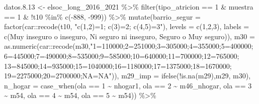 \documentclass[
  12pt,
]{book}
\newenvironment{Shaded}{\begin{snugshade}}{\end{snugshade}}
\newcommand{\AttributeTok}[1]{\textcolor[rgb]{0.77,0.63,0.00}{#1}}
\newcommand{\DecValTok}[1]{\textcolor[rgb]{0.00,0.00,0.81}{#1}}
\newcommand{\FloatTok}[1]{\textcolor[rgb]{0.00,0.00,0.81}{#1}}
\newcommand{\FunctionTok}[1]{\textcolor[rgb]{0.00,0.00,0.00}{#1}}
\newcommand{\NormalTok}[1]{#1}
\newcommand{\OtherTok}[1]{\textcolor[rgb]{0.56,0.35,0.01}{#1}}
\newcommand{\SpecialCharTok}[1]{\textcolor[rgb]{0.00,0.00,0.00}{#1}}
\newcommand{\StringTok}[1]{\textcolor[rgb]{0.31,0.60,0.02}{#1}}
\begin{document}
\begin{Shaded}
\begin{Highlighting}[]
\NormalTok{datos.}\FloatTok{8.13} \OtherTok{\textless{}{-}}\NormalTok{ elsoc\_long\_2016\_2021 }\SpecialCharTok{\%\textgreater{}\%} 
  \FunctionTok{filter}\NormalTok{(tipo\_atricion }\SpecialCharTok{==} \DecValTok{1} \SpecialCharTok{\&}\NormalTok{ muestra }\SpecialCharTok{==} \DecValTok{1} \SpecialCharTok{\&} \SpecialCharTok{!}\NormalTok{t10 }\SpecialCharTok{\%in\%} \FunctionTok{c}\NormalTok{(}\SpecialCharTok{{-}}\DecValTok{888}\NormalTok{, }\SpecialCharTok{{-}}\DecValTok{999}\NormalTok{)) }\SpecialCharTok{\%\textgreater{}\%} 
  \FunctionTok{mutate}\NormalTok{(}\AttributeTok{barrio\_segur =} \FunctionTok{factor}\NormalTok{(car}\SpecialCharTok{::}\FunctionTok{recode}\NormalTok{(t10, }\StringTok{"c(1,2)=1; c(3)=2; c(4,5)=3"}\NormalTok{), }\AttributeTok{levels =} \FunctionTok{c}\NormalTok{(}\DecValTok{1}\NormalTok{,}\DecValTok{2}\NormalTok{,}\DecValTok{3}\NormalTok{),}
                               \AttributeTok{labels =} \FunctionTok{c}\NormalTok{(}\StringTok{\textquotesingle{}Muy inseguro o inseguro\textquotesingle{}}\NormalTok{, }\StringTok{\textquotesingle{}Ni seguro ni inseguro\textquotesingle{}}\NormalTok{,}
                                          \StringTok{\textquotesingle{}Seguro o Muy seguro\textquotesingle{}}\NormalTok{)),}
         \AttributeTok{m30 =} \FunctionTok{as.numeric}\NormalTok{(car}\SpecialCharTok{::}\FunctionTok{recode}\NormalTok{(m30,}\StringTok{"1=110000;2=251000;3=305000;4=355000;5=400000;}
\StringTok{                                           6=445000;7=490000;8=535000;9=585000;10=640000;11=700000;12=765000;}
\StringTok{                                           13=845000;14=935000;15=1040000;16=1180000;17=1375000;18=1670000;}
\StringTok{                                           19=2275000;20=2700000;NA=NA"}\NormalTok{)),}
         \AttributeTok{m29\_imp =} \FunctionTok{ifelse}\NormalTok{(}\SpecialCharTok{!}\FunctionTok{is.na}\NormalTok{(m29),m29, m30),}
         \AttributeTok{n\_hogar =} \FunctionTok{case\_when}\NormalTok{(ola }\SpecialCharTok{==} \DecValTok{1} \SpecialCharTok{\textasciitilde{}}\NormalTok{ nhogar1, ola }\SpecialCharTok{==} \DecValTok{2} \SpecialCharTok{\textasciitilde{}}\NormalTok{ m46\_nhogar,}
\NormalTok{                             ola }\SpecialCharTok{==} \DecValTok{3} \SpecialCharTok{\textasciitilde{}}\NormalTok{ m54, ola }\SpecialCharTok{==} \DecValTok{4} \SpecialCharTok{\textasciitilde{}}\NormalTok{ m54, ola }\SpecialCharTok{==} \DecValTok{5} \SpecialCharTok{\textasciitilde{}}\NormalTok{ m54)) }\SpecialCharTok{\%\textgreater{}\%}

\end{Highlighting}
\end{Shaded}
\end{document}
